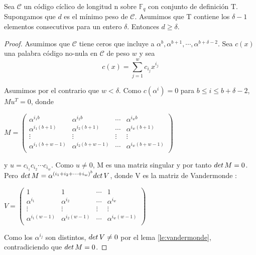 \begin{theorem}
\label{th:cota_bch}
Sea $\mathcal{C}$ un código cíclico de longitud n sobre $\mathbb{F}_q$ con conjunto de definición T. Supongamos que $d$ es el mínimo peso de $\mathcal{C}$. Asumimos que T contiene los $\delta -1$ elementos consecutivos para un entero $\delta$. Entonces $d \geq \delta$.
\end{theorem}

\begin{proof}
Asumimos que $\mathcal{C}$ tiene ceros que incluye a $\alpha^b,\alpha^{b+1}, \cdots , \alpha^{b+\delta-2}$. Sea $c(x)$ una palabra código no-nula en $\mathcal{C}$ de peso $w$ y sea 
\[ 
	c(x) = \sum_{j=1}^w c_{i_j}x^{i_j}
\]

Asumimos por el contrario que $w < \delta$. Como $c(\alpha^i) = 0$ para $ b \leq i \leq b+\delta -2$, $Mu^T = 0$, donde 

$ M = \begin{pmatrix}
	 \alpha^{i_1b} & \alpha^{i_2b} & \cdots & \alpha^{i_wb} \\
	 \alpha^{i_1(b+1)} & \alpha^{i_2(b+1)} & \cdots  & \alpha^{i_w(b+1)} \\
	 \vdots & \vdots & \vdots & \vdots  \\
     \alpha^{i_1(b+w-1)} & \alpha^{i_2(b+w-1)} & \cdots  & \alpha^{i_w(b+w-1)} \\
	\end{pmatrix}$
	
y $u=c_{i_1}c_{i_2}\cdots c_{i_w}$. Como $u \neq 0$, M es una matriz singular y por tanto $det \thinspace M = 0$. Pero $det \thinspace M = \alpha^{(i_1+i_2+\cdots + i_w)^b}det \thinspace V$, donde V es la matriz de Vandermonde :

$ V = \begin{pmatrix}
	 1 & 1 & \cdots & 1 \\
	 \alpha^{i_1} & \alpha^{i_2} & \cdots  & \alpha^{i_w} \\
	 \vdots & \vdots & \vdots & \vdots  \\
     \alpha^{i_1(w-1)} & \alpha^{i_2(w-1)} & \cdots  & \alpha^{i_w(w-1)} \\
	\end{pmatrix}$
	
Como los $\alpha^{i_j}$ son distintos, $det \thinspace V \neq 0$ por el lema \ref{le:vandermonde}, contradiciendo que $det \thinspace M = 0$.
\end{proof}

